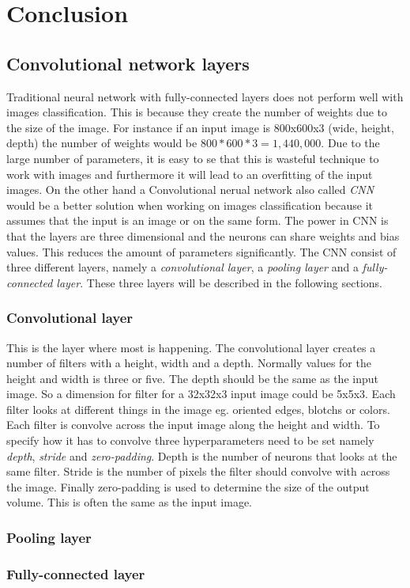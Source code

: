 \chapter{Conclusion}
\label{chp:conc}

\section{Convolutional network layers}

Traditional neural network with fully-connected layers does not perform well with images classification. This is because they create the number of weights due to the size of the image. For instance if an input image is 800x600x3 (wide, height, depth) the number of weights would be $800 * 600 * 3 = 1,440,000$. Due to the large number of parameters, it is easy to se that this is wasteful technique to work with images and furthermore it will lead to an overfitting of the input images. On the other hand a
Convolutional nerual network also called \emph{CNN} would be a better solution when working on images classification because it assumes that the input is an image or on the same form. The power in CNN is that the layers are three dimensional and the neurons can share weights and bias values. This reduces the amount of parameters significantly. The CNN consist of three different layers, namely a \emph{convolutional layer}, a \emph{pooling layer} and a \emph{fully-connected layer}. These three layers will be described in the following sections.
 
\subsection{Convolutional layer}
This is the layer where most is happening. The convolutional layer creates a number of filters with a height, width and a depth. Normally values for the height and width is three or five. The depth should be the same as the input image. So a dimension for filter for a 32x32x3 input image could be 5x5x3. Each filter looks at different things in the image eg. oriented edges, blotchs or colors. Each filter is convolve across the input image along the height and width. To specify how it has to convolve three hyperparameters need to be set namely \emph{depth}, \emph{stride} and \emph{zero-padding}. Depth is the number of neurons that looks at the same filter. Stride is the number of pixels the filter should convolve with across the image. Finally zero-padding is used to determine the size of the output volume. This is often the same as the input image. 

\subsection{Pooling layer}

\subsection{Fully-connected layer}